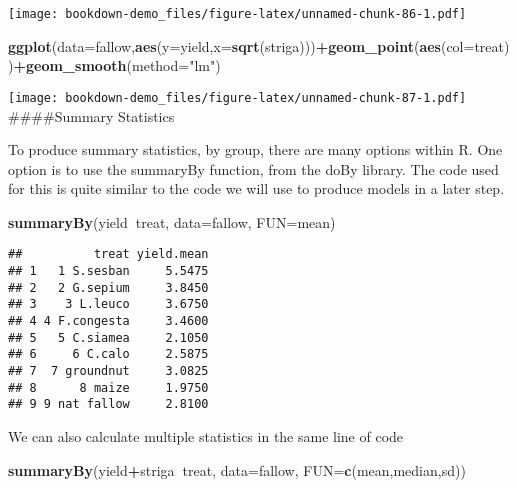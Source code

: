 \documentclass[]{book}
\newenvironment{Shaded}{\begin{snugshade}}{\end{snugshade}}
\newcommand{\KeywordTok}[1]{\textcolor[rgb]{0.13,0.29,0.53}{\textbf{#1}}}
\newcommand{\DataTypeTok}[1]{\textcolor[rgb]{0.13,0.29,0.53}{#1}}
\newcommand{\StringTok}[1]{\textcolor[rgb]{0.31,0.60,0.02}{#1}}
\newcommand{\OperatorTok}[1]{\textcolor[rgb]{0.81,0.36,0.00}{\textbf{#1}}}
\newcommand{\NormalTok}[1]{#1}
\theoremstyle{definition}
\theoremstyle{definition}
\theoremstyle{definition}
\theoremstyle{remark}
\begin{document}
\texttt{[image: bookdown-demo\_files/figure-latex/unnamed-chunk-86-1.pdf]}

\begin{Shaded}
\begin{Highlighting}[]
\KeywordTok{ggplot}\NormalTok{(}\DataTypeTok{data=}\NormalTok{fallow,}\KeywordTok{aes}\NormalTok{(}\DataTypeTok{y=}\NormalTok{yield,}\DataTypeTok{x=}\KeywordTok{sqrt}\NormalTok{(striga)))}\OperatorTok{+}\KeywordTok{geom_point}\NormalTok{(}\KeywordTok{aes}\NormalTok{(}\DataTypeTok{col=}\NormalTok{treat))}\OperatorTok{+}\KeywordTok{geom_smooth}\NormalTok{(}\DataTypeTok{method=}\StringTok{"lm"}\NormalTok{)}
\end{Highlighting}
\end{Shaded}

\texttt{[image: bookdown-demo\_files/figure-latex/unnamed-chunk-87-1.pdf]}
\#\#\#\#Summary Statistics

To produce summary statistics, by group, there are many options within
R. One option is to use the summaryBy function, from the doBy library.
The code used for this is quite similar to the code we will use to
produce models in a later step.

\begin{Shaded}
\begin{Highlighting}[]
\KeywordTok{summaryBy}\NormalTok{(yield}\OperatorTok{~}\NormalTok{treat, }\DataTypeTok{data=}\NormalTok{fallow, }\DataTypeTok{FUN=}\NormalTok{mean)}
\end{Highlighting}
\end{Shaded}

\begin{verbatim}
##          treat yield.mean
## 1   1 S.sesban     5.5475
## 2   2 G.sepium     3.8450
## 3    3 L.leuco     3.6750
## 4 4 F.congesta     3.4600
## 5   5 C.siamea     2.1050
## 6     6 C.calo     2.5875
## 7  7 groundnut     3.0825
## 8      8 maize     1.9750
## 9 9 nat fallow     2.8100
\end{verbatim}

We can also calculate multiple statistics in the same line of code

\begin{Shaded}
\begin{Highlighting}[]
\KeywordTok{summaryBy}\NormalTok{(yield}\OperatorTok{+}\NormalTok{striga}\OperatorTok{~}\NormalTok{treat, }\DataTypeTok{data=}\NormalTok{fallow, }\DataTypeTok{FUN=}\KeywordTok{c}\NormalTok{(mean,median,sd))}
\end{Highlighting}
\end{Shaded}
\end{document}
